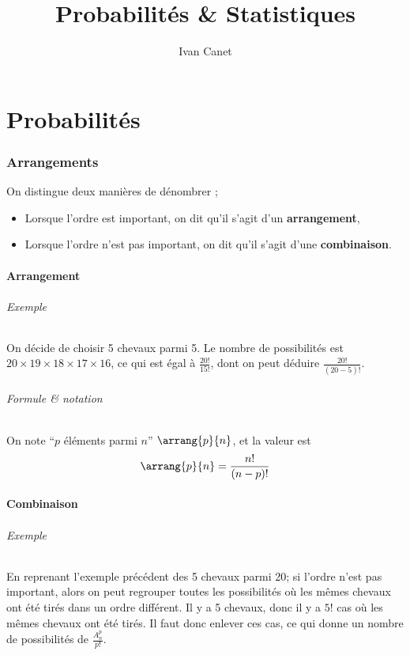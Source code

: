 \documentclass[10pt,a4paper,french]{article}
\begin{document}
\title{Probabilités \& Statistiques}
\author{Ivan Canet}
\maketitle

\tableofcontents

\part{Probabilités}

\section{Arrangements}

On distingue deux manières de dénombrer ;

\begin{itemize}
\item Lorsque l'ordre est important, on dit qu'il s'agit d'un \textbf{arrangement},
\item Lorsque l'ordre n'est pas important, on dit qu'il s'agit d'une \textbf{combinaison}.
\end{itemize}

\subsection{Arrangement}

\paragraph{Exemple}
On décide de choisir 5 chevaux parmi 5. Le nombre de possibilités est $20 \times 19 \times 18 \times 17 \times 16$, ce qui est égal à $\frac{20!}{15!}$, dont on peut déduire $\frac{20!}{(20-5)!}$.

\paragraph{Formule \& notation}
On note ``$p$ éléments parmi $n$'' $\arrang{p}{n}$, et la valeur est \[ \arrang{p}{n} = \frac{n!}{(n-p)!} \]

\subsection{Combinaison}

\paragraph{Exemple}
En reprenant l'exemple précédent des 5 chevaux parmi 20; si l'ordre n'est pas important, alors on peut regrouper toutes les possibilités où les mêmes chevaux ont été tirés dans un ordre différent. Il y a 5 chevaux, donc il y a $5!$ cas où les mêmes chevaux ont été tirés. Il faut donc enlever ces cas, ce qui donne un nombre de possibilités de $\frac{A_n^p}{p!}$.
\end{document}
